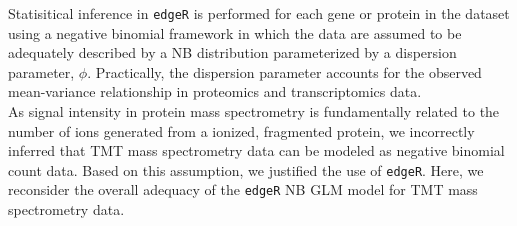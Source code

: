 \documentclass[11pt]{elife}\usepackage[]{graphicx}\usepackage[]{color}
\begin{document}
Statisitical inference in \texttt{edgeR} is performed for each gene or protein in
the dataset using a negative binomial framework in which the data are assumed to 
be adequately described by a NB distribution parameterized by a dispersion 
parameter, $\phi$. Practically, the dispersion parameter accounts for the
observed mean-variance relationship in proteomics and transcriptomics data.\\


As signal intensity in protein mass spectrometry is fundamentally related to the
number of ions generated from a ionized, fragmented protein, we incorrectly
inferred that TMT mass spectrometry data can be modeled as negative binomial
count data. Based on this assumption, we justified the use of \texttt{edgeR}.
Here, we reconsider the overall adequacy of the \texttt{edgeR} NB GLM model for
TMT mass spectrometry data.\\
\end{document}
